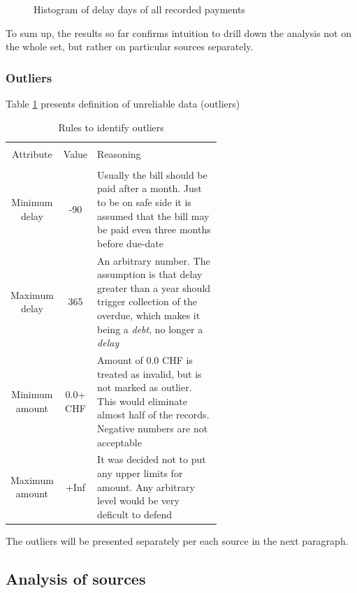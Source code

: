 \documentclass{article}
\begin{document}
\begin{figure}[htbp!]
    \begin{center}
        
    \end{center}
    \caption{Histogram of delay days of all recorded payments}
    \label{fig:001_delay_days_hist}
\end{figure}

To sum up, the results so far confirms intuition to drill down the analysis not on the whole set, but rather on particular sources separately.

\subsubsection{Outliers}

Table \ref{tab:002_outlier_def} presents definition of unreliable data (outliers)

\begin{table}[!htbp]
    \centering
    \caption{Rules to identify outliers}
    \label{tab:002_outlier_def}
    \begin{tabular}{c c p{0.6\linewidth}}
    \hline\hline \\
    Attribute & Value & Reasoning \\
    \hline \\
    Minimum delay & -90 & Usually the bill should be paid after a month. Just to be on safe side it is assumed that the bill may be paid even three months before due-date\\
    Maximum delay & 365 & An arbitrary number. The assumption is that delay greater than a year should trigger collection of the overdue, which makes it being a \textit{debt}, no longer a \textit{delay} \\
    Minimum amount & 0.0+ CHF & Amount of 0.0 CHF is treated as invalid, but is not marked as outlier. This would eliminate almost half of the records. Negative numbers are not acceptable \\
    Maximum amount & +Inf & It was decided not to put any upper limits for amount. Any arbitrary level would be very deficult to defend \\
    \end{tabular}
\end{table}

The outliers will be presented separately per each source in the next paragraph.\par

\subsection{Analysis of sources}
\end{document}
